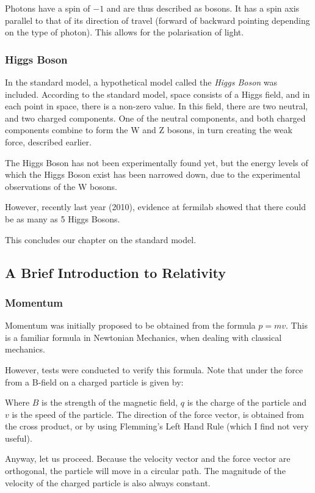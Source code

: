 Photons have a spin of $-1$ and are thus described as bosons. It has a spin axis parallel to that of its direction of travel (forward of backward pointing depending on the type of photon). This allows for the polarisation of light.

\subsubsection{Higgs Boson}
In the standard model, a hypothetical model called the \emph{Higgs Boson} was included. According to the standard model, space consists of a Higgs field, and in each point in space, there is a non-zero value. In this field, there are two neutral, and two charged components. One of the neutral components, and both charged components combine to form the W and Z bosons, in turn creating the weak force, described earlier.

The Higgs Boson has not been experimentally found yet, but the energy levels of which the Higgs Boson exist has been narrowed down, due to the experimental observations of the W bosons.

However, recently last year (2010), evidence at fermilab showed that there could be as many as 5 Higgs Bosons.

This concludes our chapter on the standard model.

\subsection{A Brief Introduction to Relativity}

\subsubsection{Momentum}
Momentum was initially proposed to be obtained from the formula $p=mv$. This is a familiar formula in Newtonian Mechanics, when dealing with classical mechanics.

However, tests were conducted to verify this formula. Note that under the force from a B-field on a charged particle is given by:

Where $B$ is the strength of the magnetic field, $q$ is the charge of the particle and $v$ is the speed of the particle. The direction of the force vector, is obtained from the cross product, or by using Flemming's Left Hand Rule (which I find not very useful).

Anyway, let us proceed. Because the velocity vector and the force vector are orthogonal, the particle will move in a circular path. The magnitude of the velocity of the charged particle is also always constant.

